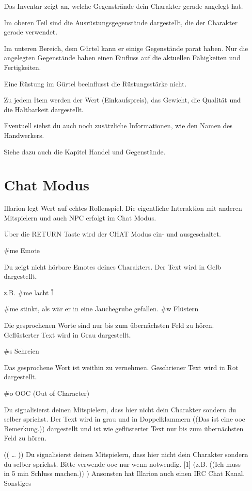 \documentclass[a4paper,11pt]{book}
\begin{document}
Das Inventar zeigt an, welche Gegenstrände dein Charakter gerade angelegt hat.

Im oberen Teil sind die Ausrüstungsgegenstände dargestellt, die der Charakter gerade verwendet.

Im unteren Bereich, dem Gürtel kann er einige Gegenstände parat haben. Nur die angelegten Gegenstände haben einen Einfluss auf die aktuellen Fähigkeiten und Fertigkeiten.

Eine Rüstung im Gürtel beeinflusst die Rüstungsstärke nicht.

Zu jedem Item werden der Wert (Einkaufspreis), das Gewicht, die Qualität und die Haltbarkeit dargestellt.

Eventuell siehst du auch noch zusätzliche Informationen, wie den Namen des Handwerkers.

Siehe dazu auch die Kapitel Handel und Gegenstände.

\section{Chat Modus}

Illarion legt Wert auf echtes Rollenspiel. Die eigentliche Interaktion mit anderen Mitspielern und auch NPC erfolgt im Chat Modus.

Über die RETURN Taste wird der CHAT Modus ein- und ausgeschaltet.

\#me  Emote

Du zeigt nicht hörbare Emotes deines Charakters. Der Text wird in Gelb dargestellt.

z.B.  \#me lacht  Î

 \#me stinkt, als wär er in eine Jauchegrube gefallen. \#w  Flüstern

Die gesprochenen Worte sind nur bis zum übernächsten Feld zu hören. Geflüsterter Text wird in Grau dargestellt.

\#s  Schreien

Das gesprochene Wort ist weithin zu vernehmen. Geschriener Text wird in Rot dargestellt.

\#o  OOC (Out of Character)

Du signalisierst deinen Mitspielern, dass hier nicht dein Charakter sondern du selber sprichst. Der Text wird in grau und in Doppelklammern ((Das ist eine ooc Bemerkung.)) dargestellt und ist wie geflüsterter Text nur bis zum übernächsten Feld zu hören.

(( … )) Du signalisierst deinen Mitspielern, dass hier nicht dein Charakter sondern du selber sprichst. Bitte verwende ooc nur wenn notwendig. [1] (z.B. ((Ich muss in 5 min Schluss machen.)) ) Ansonsten hat Illarion auch einen IRC Chat Kanal. Sonstiges
\end{document}
